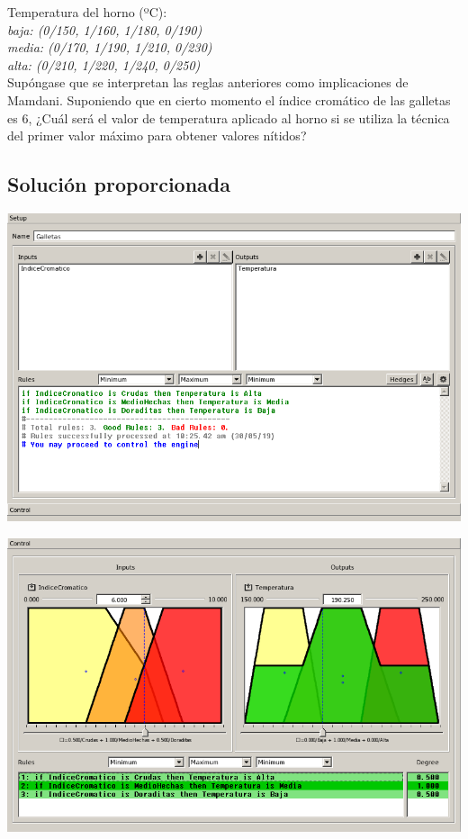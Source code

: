 \documentclass{article}
\newcommand\tab[1][1cm]{\hspace*{#1}}
\begin{document}
Temperatura del horno (ºC):\\
\tab \textit{baja: (0/150, 1/160, 1/180, 0/190)} \\
\tab \textit{media: (0/170, 1/190, 1/210, 0/230)} \\
\tab \textit{alta: (0/210, 1/220, 1/240, 0/250)} \\
Supóngase que se interpretan las reglas anteriores como implicaciones de Mamdani. Suponiendo que en cierto momento el índice cromático de las galletas es 6, ¿Cuál será el valor de temperatura aplicado al horno si se utiliza la técnica del primer valor máximo para obtener valores nítidos?

\subsection{Solución proporcionada}

\begin{center}
\includegraphics[scale=0.5]{images/ej2.png}
\end{center}

\begin{center}
\includegraphics[scale=0.5]{images/ej22.png}
\end{center}
\end{document}
